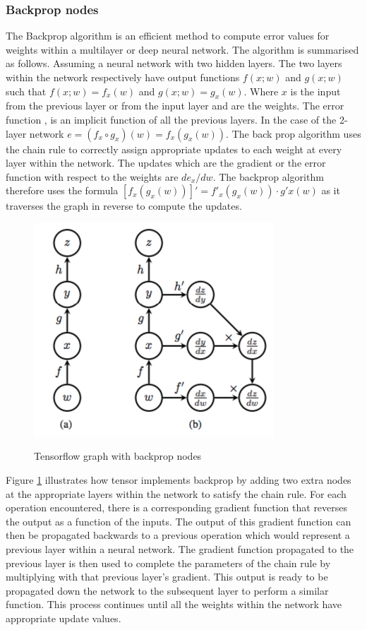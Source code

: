 \subsubsection{Backprop nodes}
The Backprop algorithm \cite{Goodfellow-et-al-2016} is an efficient method to compute error values for weights within a multilayer or deep neural network.  The algorithm is summarised as follows.  Assuming a neural network with two hidden layers. The two layers within the network respectively have output functions $f(x;w)$ and $g(x;w)$ such that $f(x;w)=f_x(w)$ and $g(x;w)=g_x(w)$.  Where $x$ is the input from the previous layer or from the input layer and  are the weights.  The error function , is an implicit function of all the previous layers.  In the case of the 2-layer network $e=(f_x \circ g_x)(w)=f_x(g_x(w))$.  The back prop algorithm uses the chain rule to correctly assign appropriate updates to each weight at every layer within the network.  The updates which are the gradient or the error function with respect to the weights are $de_x/dw$. The backprop algorithm therefore uses the formula $[f_x(g_x(w))]'=f'_x(g_x(w))\cdot g'x(w)$ as it traverses the graph in reverse to compute the updates. 
\begin{figure}
\centering
  \includegraphics[width=9cm]{thesis/images/bprop}\\
  \caption{Tensorflow graph with backprop nodes \citep{goldsborough2016tour}}\label{fig_c3_bprop}
\end{figure}

Figure \ref{fig_c3_bprop} illustrates how tensor implements backprop by adding two extra nodes at the appropriate layers within the network to satisfy the chain rule.  For each operation encountered, there is a corresponding gradient function that reverses the output as a function of the inputs.  The output of this gradient function can then be propagated backwards to a previous operation which would represent a previous layer within a neural network.  The gradient function propagated to the previous layer is then used to complete the parameters of the chain rule by multiplying with that previous layer’s gradient.  This output is ready to be propagated down the network to the subsequent layer to perform a similar function.  This process continues until all the weights within the network have appropriate update values.

